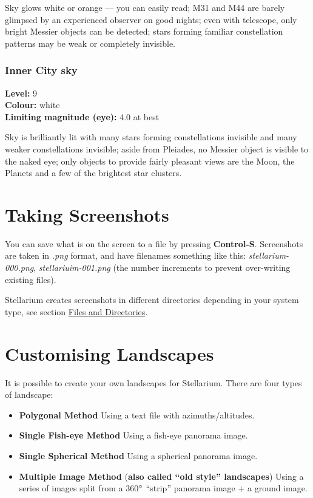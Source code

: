 Sky glows white or orange --- you can easily read; M31 and M44 are barely glimpsed by an experienced observer on good nights; even with telescope, only bright Messier objects can be detected; stars forming familiar constellation patterns may be weak or completely invisible.

\subsection{Inner City sky}
\textbf{Level:} 9 \\
\textbf{Colour:} white \\
\textbf{Limiting magnitude (eye):} 4.0 at best

Sky is brilliantly lit with many stars forming constellations invisible and many weaker
constellations invisible; aside from Pleiades, no Messier object is visible to the naked eye; only objects to provide fairly pleasant views are the Moon, the Planets and a few of the brightest star clusters.

\chapter{Taking Screenshots}\label{taking-screenshots}

You can save what is on the screen to a file by pressing
\textbf{Control-S}. Screenshots are taken in \emph{.png} format, and
have filenames something like this: \emph{stellarium-000.png},
\emph{stellariuim-001.png} (the number increments to prevent
over-writing existing files).

Stellarium creates screenshots in different directories depending in
your system type, see section
\href{Advanced_Use\#Files_and_Directories}{Files and Directories}.

\chapter{Customising Landscapes}\label{customising-landscapes}

It is possible to create your own landscapes for Stellarium. There are
four types of landscape:

\begin{itemize}
\item
  \textbf{Polygonal Method} Using a text file with azimuths/altitudes.
\item
  \textbf{Single Fish-eye Method} Using a fish-eye panorama image.
\item
  \textbf{Single Spherical Method} Using a spherical panorama image.
\item
  \textbf{Multiple Image Method} (\textbf{also called ``old style''
  landscapes}) Using a series of images split from a 360$\degree$ ``strip''
  panorama image + a ground image.
\end{itemize}

